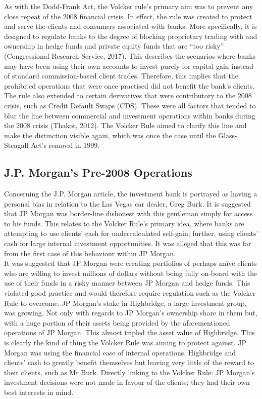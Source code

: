 \documentclass[11pt, english]{article}
\begin{document}
	As with the Dodd-Frank Act, the Volcker rule's primary aim was to prevent any close repeat of the 2008 financial crisis. In effect, the rule was created to protect and serve the clients and consumers associated with banks. More specifically, it is designed to regulate banks to the degree of blocking proprietary trading with and ownership in hedge funds and private equity funds that are ``too risky'' (Congressional Research Service, 2017). This describes the scenarios where banks may have been using their own accounts to invest purely for capital gain instead of standard commission-based client trades. Therefore, this implies that the prohibited operations that were once practised did not benefit the bank's clients. The rule also extended to certain derivatives that were contributory to the 2008 crisis, such as Credit Default Swaps (CDS). These were all factors that tended to blur the line between commercial and investment operations within banks during the 2008 crisis (Thakor, 2012). The Volcker Rule aimed to clarify this line and make the distinction visible again, which was once the case until the Glass-Steagall Act's removal in 1999.

	\subsection{J.P. Morgan's Pre-2008 Operations}

	Concerning the J.P. Morgan article, the investment bank is portrayed as having a personal bias in relation to the Las Vegas car dealer, Greg Burk. It is suggested that JP Morgan was border-line dishonest with this gentleman simply for access to his funds. This relates to the Volcker Rule's primary idea, where banks are attempting to use clients' cash for undercalculated self-gain; further, using clients' cash for large internal investment opportunities. It was alleged that this was far from the first case of this behaviour within JP Morgan.\\

	It was suggested that JP Morgan were creating portfolios of perhaps naïve clients who are willing to invest millions of dollars without being fully on-board with the use of their funds in a risky manner between JP Morgan and hedge funds. This violated good practice and would therefore require regulation such as the Volcker Rule to overcome. JP Morgan's stake in Highbridge, a large investment group, was growing. Not only with regards to JP Morgan's ownership share in them but, with a huge portion of their assets being provided by the aforementioned operations of JP Morgan. This almost tripled the asset value of Highbridge. This is clearly the kind of thing the Volcker Rule was aiming to protect against. JP Morgan was using the financial ease of internal operations, Highbridge and clients' cash to greatly benefit themselves but leaving very little of the reward to their clients, such as Mr Burk. Directly linking to the Volcker Rule: JP Morgan's investment decisions were not made in favour of the clients; they had their own best interests in mind.\\
\end{document}
